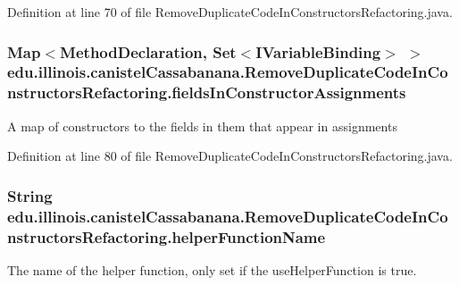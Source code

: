 Definition at line 70 of file RemoveDuplicateCodeInConstructorsRefactoring.java.

\hypertarget{classedu_1_1illinois_1_1canistelCassabanana_1_1RemoveDuplicateCodeInConstructorsRefactoring_af04c901de5714458dd9511acf45bd472}{
\subsubsection[{fieldsInConstructorAssignments}]{\setlength{\rightskip}{0pt plus 5cm}Map$<$MethodDeclaration, Set$<$IVariableBinding$>$ $>$ {\bf edu.illinois.canistelCassabanana.RemoveDuplicateCodeInConstructorsRefactoring.fieldsInConstructorAssignments}}}
\label{classedu_1_1illinois_1_1canistelCassabanana_1_1RemoveDuplicateCodeInConstructorsRefactoring_af04c901de5714458dd9511acf45bd472}
A map of constructors to the fields in them that appear in assignments 

Definition at line 80 of file RemoveDuplicateCodeInConstructorsRefactoring.java.

\hypertarget{classedu_1_1illinois_1_1canistelCassabanana_1_1RemoveDuplicateCodeInConstructorsRefactoring_aeec592ffa5b5903205515925d84c2bb8}{
\subsubsection[{helperFunctionName}]{\setlength{\rightskip}{0pt plus 5cm}String {\bf edu.illinois.canistelCassabanana.RemoveDuplicateCodeInConstructorsRefactoring.helperFunctionName}}}
\label{classedu_1_1illinois_1_1canistelCassabanana_1_1RemoveDuplicateCodeInConstructorsRefactoring_aeec592ffa5b5903205515925d84c2bb8}
The name of the helper function, only set if the {\ttfamily useHelperFunction} is {\ttfamily true}. 

